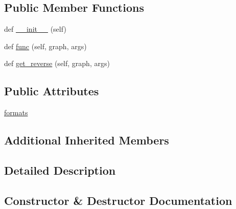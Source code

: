\subsection*{Public Member Functions}
\begin{DoxyCompactItemize}
\item 
def \hyperlink{classlight__chats_1_1graph_1_1FollowFunction_a9945fa88f60ace0c4ff70bcedde1d92c}{\+\_\+\+\_\+init\+\_\+\+\_\+} (self)
\item 
def \hyperlink{classlight__chats_1_1graph_1_1FollowFunction_a6d1937938725b143930c10260adae130}{func} (self, graph, args)
\item 
def \hyperlink{classlight__chats_1_1graph_1_1FollowFunction_a1421ab114b2675c3a138e6b005036022}{get\+\_\+reverse} (self, graph, args)
\end{DoxyCompactItemize}
\subsection*{Public Attributes}
\begin{DoxyCompactItemize}
\item 
\hyperlink{classlight__chats_1_1graph_1_1FollowFunction_a3d3473d546a129f03d497102b10ea2a9}{formats}
\end{DoxyCompactItemize}
\subsection*{Additional Inherited Members}


\subsection{Detailed Description}
\begin{DoxyVerb}
\end{DoxyVerb}
 

\subsection{Constructor \& Destructor Documentation}
\mbox{\label{classlight__chats_1_1graph_1_1FollowFunction_a9945fa88f60ace0c4ff70bcedde1d92c}} 
